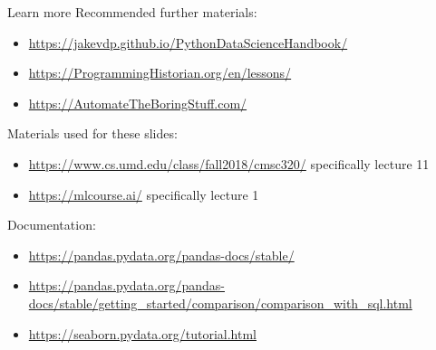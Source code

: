 \documentclass[aspectratio=169,usenames,dvipsnames]{beamer}
\begin{document}
\begin{frame}{Learn more}
    Recommended further materials:
    \vspace{1em}
    \begin{itemize}
        \item \url{https://jakevdp.github.io/PythonDataScienceHandbook/}
        \item \url{https://ProgrammingHistorian.org/en/lessons/}
        \item \url{https://AutomateTheBoringStuff.com/}
    \end{itemize}
\end{frame}

\begin{frame}
Materials used for these slides:
\begin{itemize}
\item \url{https://www.cs.umd.edu/class/fall2018/cmsc320/}
    specifically lecture 11
\item \url{https://mlcourse.ai/}
    specifically lecture 1
\end{itemize}

\vspace{1em}
Documentation:
\begin{itemize}
    \item \url{https://pandas.pydata.org/pandas-docs/stable/}
    \item \url{https://pandas.pydata.org/pandas-docs/stable/getting_started/comparison/comparison_with_sql.html}
    \item \url{https://seaborn.pydata.org/tutorial.html}
\end{itemize}
\end{frame}
\end{document}
